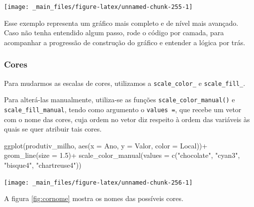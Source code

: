 \documentclass[
  brazilian,
]{book}
\newenvironment{Shaded}{\begin{snugshade}}{\end{snugshade}}
\newcommand{\AttributeTok}[1]{\textcolor[rgb]{0.77,0.63,0.00}{#1}}
\newcommand{\FloatTok}[1]{\textcolor[rgb]{0.00,0.00,0.81}{#1}}
\newcommand{\FunctionTok}[1]{\textcolor[rgb]{0.00,0.00,0.00}{#1}}
\newcommand{\NormalTok}[1]{#1}
\newcommand{\SpecialCharTok}[1]{\textcolor[rgb]{0.00,0.00,0.00}{#1}}
\newcommand{\StringTok}[1]{\textcolor[rgb]{0.31,0.60,0.02}{#1}}
\begin{document}
\begin{center}\texttt{[image: \_main\_files/figure-latex/unnamed-chunk-255-1]} \end{center}

Esse exemplo representa um gráfico mais completo e de nível mais avançado. Caso não tenha entendido algum passo, rode o código por camada, para acompanhar a progressão de construção do gráfico e entender a lógica por trás.

\hypertarget{cores-3}{%
\subsubsection*{Cores}\label{cores-3}}

Para mudarmos as escalas de cores, utilizamos a \texttt{scale\_color\_} e \texttt{scale\_fill\_}.

Para alterá-las manualmente, utiliza-se as funções \texttt{scale\_color\_manual()} e \texttt{scale\_fill\_manual}, tendo como argumento o \texttt{values\ =}, que recebe um vetor com o nome das cores, cuja ordem no vetor diz respeito à ordem das variáveis às quais se quer atribuir tais cores.

\begin{Shaded}
\begin{Highlighting}[]
\FunctionTok{ggplot}\NormalTok{(produtiv\_milho, }
       \FunctionTok{aes}\NormalTok{(}\AttributeTok{x =}\NormalTok{ Ano,}
           \AttributeTok{y =}\NormalTok{ Valor,}
           \AttributeTok{color =}\NormalTok{ Local))}\SpecialCharTok{+}
  \FunctionTok{geom\_line}\NormalTok{(}\AttributeTok{size =} \FloatTok{1.5}\NormalTok{)}\SpecialCharTok{+}
  \FunctionTok{scale\_color\_manual}\NormalTok{(}\AttributeTok{values =} \FunctionTok{c}\NormalTok{(}\StringTok{"chocolate"}\NormalTok{, }\StringTok{"cyan3"}\NormalTok{, }\StringTok{"bisque4"}\NormalTok{, }\StringTok{"chartreuse4"}\NormalTok{))}
\end{Highlighting}
\end{Shaded}

\begin{center}\texttt{[image: \_main\_files/figure-latex/unnamed-chunk-256-1]} \end{center}

A figura \ref{fig:cornome} mostra os nomes das possíveis cores.
\end{document}
